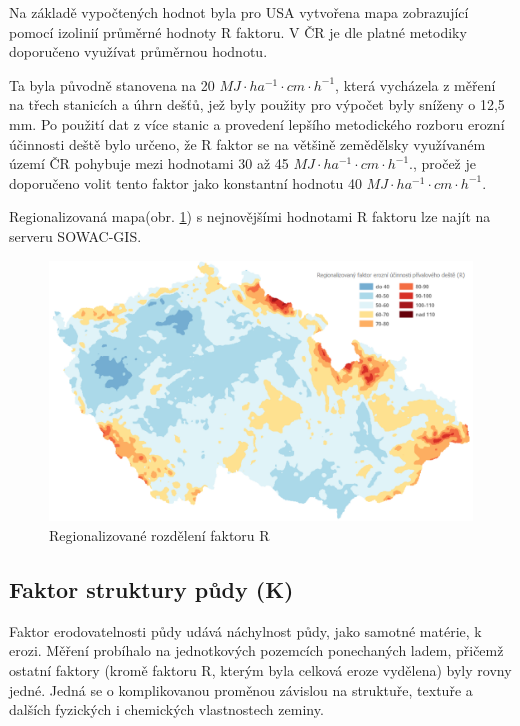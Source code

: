 Na základě vypočtených hodnot byla pro USA vytvořena mapa zobrazující
pomocí izolinií průměrné hodnoty R faktoru. \cite{usle1978} V ČR je
dle platné metodiky doporučeno využívat průměrnou
hodnotu.\cite{janecek2012}

Ta byla původně stanovena na 20 $MJ\cdot ha^{-1}\cdot cm \cdot
h^{-1}$, která vycházela z měření na třech stanicích a úhrn dešťů, jež
byly použity pro výpočet byly sníženy o 12,5 mm. Po použití dat z více
stanic a provedení lepšího metodického rozboru erozní účinnosti deště
bylo určeno, že R faktor se na většině zemědělsky využívaném území ČR
pohybuje mezi hodnotami 30 až 45 $MJ\cdot ha^{-1}\cdot cm \cdot
h^{-1}$., pročež je doporučeno volit tento faktor jako konstantní
hodnotu 40 $MJ\cdot ha^{-1}\cdot cm \cdot h^{-1}$.\cite{janecek2012}

Regionalizovaná mapa(obr. \ref{fig:r_faktor}) s nejnovějšími hodnotami
R faktoru lze najít na serveru SOWAC-GIS.\cite{sowac}

\begin{figure}[H]
    \centering \includegraphics[scale=0.5]{./pictures/r_factor.png}
      \caption{Regionalizované rozdělení faktoru R}
      \label{fig:r_faktor}
\end{figure}

\subsection{Faktor struktury půdy (K)}
Faktor erodovatelnosti půdy udává náchylnost půdy, jako samotné
matérie, k erozi. Měření probíhalo na jednotkových pozemcích
ponechaných ladem, přičemž ostatní faktory (kromě faktoru R, kterým
byla celková eroze vydělena) byly rovny jedné. Jedná se o
komplikovanou proměnou závislou na struktuře, textuře a dalších
fyzických i chemických vlastnostech zeminy.\cite{usle1978}

